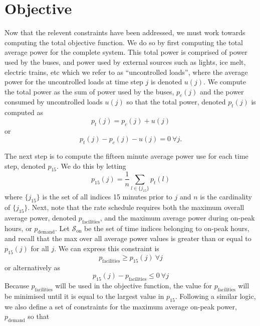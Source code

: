 \section{Objective}
\par Now that the relevent constraints have been addressed, we must work towards computing the total objective function. We do so by first computing the total average power for the complete system. This total power is comprised of power used by the buses, and power used by external sources such as lights, ice melt, electric trains, etc which we refer to as ``uncontrolled loads'', where the average power for the uncontrolled loads at time step $j$ is denoted $u(j)$. We compute the total power as the sum of power used by the buses, $p_c(j)$ and the power consumed by uncontrolled loads $u(j)$ so that the total power, denoted $p_t(j)$ is computed as 
\begin{equation*}
	p_t(j) = p_c(j) + u(j)
\end{equation*}
or 
\begin{equation}
	p_t(j) - p_c(j) - u(j) = 0 \ \forall j.
\end{equation}
\par The next step is to compute the fifteen minute average power use for each time step, denoted $p_{\text{15}}$. We do this by letting 
\begin{equation*}
p_{\text{15}}(j) = \frac{1}{n}\sum_{l \in \{j_{15}\}}p_t(l)
\end{equation*}
where $\{j_{15}\}$ is the set of all indices 15 minutes prior to $j$ and $n$ is the cardinality of $\{j_{15}\}$.
Next, note that the rate schedule requires both the maximum overall average power, denoted $p_{\text{facilities}}$, and the maximum average power during on-peak hours, or $p_{\text{demand}}$. Let $\mathcal{S}_{\text{on}}$ be the set of time indices belonging to on-peak hours, and recall that the max over all average power values is greater than or equal to $p_{15}(j)$ for all $j$. We can express this constraint is
\begin{equation*}
	p_{\text{facilities}} \ge p_{15}(j) \ \forall j
\end{equation*}
or alternatively as
\begin{equation}
	p_{15}(j) - p_{\text{facilities}} \le 0 \ \forall j
\end{equation}
Because $p_{\text{facilities}}$ will be used in the objective function, the value for $p_{\text{facilities}}$ will be minimised until it is equal to the largest value in $p_{15}$. Following a similar logic, we also define a set of constraints for the maximum average on-peak power, $p_{\text{demand}}$ so that
